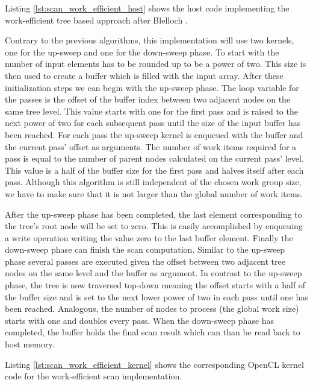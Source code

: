 Listing \ref{lst:scan_work_efficient_host} shows the host code implementing the work-efficient tree based approach after Blelloch \cite{scan_blelloch}.



Contrary to the previous algorithms, this implementation will use two kernels, one for the up-sweep and one for the down-sweep phase. 
To start with the number of input elements has to be rounded up to be a power of two. This size is then used to create a buffer which is filled with the input array.
After these initialization steps we can begin with the up-sweep phase. The loop variable for the passes is the offset of the buffer index between two adjacent nodes on the same tree level. This value starts with one for the first pass and is raised to the next power of two for each subsequent pass until the size of the input buffer has been reached. For each pass the up-sweep kernel is enqueued with the buffer and the current pass' offset as arguments. The number of work items required for a pass is equal to the number of parent nodes calculated on the current pass' level. This value is a half of the buffer size for the first pass and halves itself after each pass. Although this algorithm is still independent of the chosen work group size, we have to make sure that it is not larger than the global number of work items.

After the up-sweep phase has been completed, the last element corresponding to the tree's root node will be set to zero. This is easily accomplished by enqueuing a write operation writing the value zero to the last buffer element.
Finally the down-sweep phase can finish the scan computation. Similar to the up-sweep phase several passes are executed given the offset between two adjacent tree nodes on the same level and the buffer as argument. In contrast to the up-sweep phase, the tree is now traversed top-down meaning the offset starts with a half of the buffer size and is set to the next lower power of two in each pass until one has been reached. Analogous, the number of nodes to process (the global work size) starts with one and doubles every pass.
When the down-sweep phase has completed, the buffer holds the final scan result which can than be read back to host memory.

Listing \ref{lst:scan_work_efficient_kernel} shows the corresponding OpenCL kernel code for the work-efficient scan implementation.

